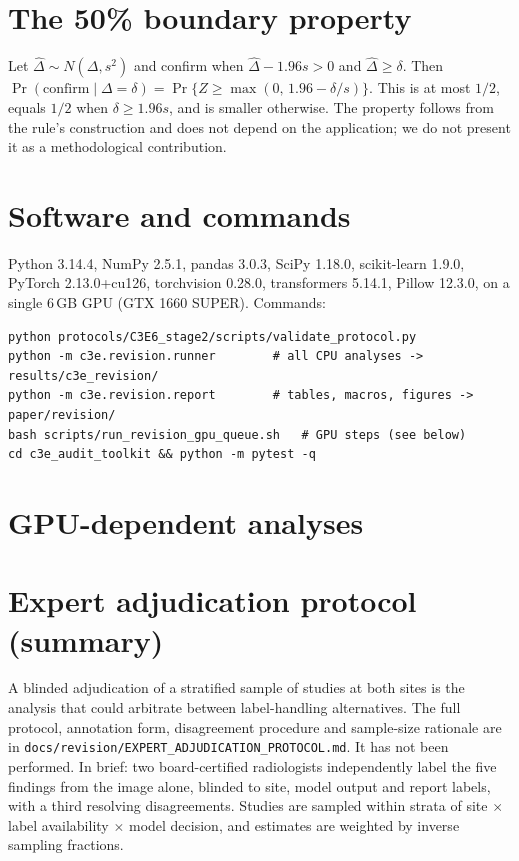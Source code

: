 \documentclass[10pt,a4paper]{article}
\begin{document}
\section{The 50\% boundary property}
Let $\hat\Delta\sim N(\Delta,s^2)$ and confirm when $\hat\Delta-1.96s>0$ and
$\hat\Delta\ge\delta$. Then
$\Pr(\text{confirm}\mid\Delta=\delta)=\Pr\{Z\ge\max(0,\,1.96-\delta/s)\}$. This
is at most $1/2$, equals $1/2$ when $\delta\ge1.96s$, and is smaller otherwise. The
property follows from the rule's construction and does not depend on the
application; we do not present it as a methodological contribution.

\section{Software and commands}
Python 3.14.4, NumPy 2.5.1, pandas 3.0.3, SciPy 1.18.0, scikit-learn 1.9.0,
PyTorch 2.13.0+cu126, torchvision 0.28.0, transformers 5.14.1, Pillow 12.3.0, on
a single 6\,GB GPU (GTX 1660 SUPER). Commands:
\begin{verbatim}
python protocols/C3E6_stage2/scripts/validate_protocol.py
python -m c3e.revision.runner        # all CPU analyses -> results/c3e_revision/
python -m c3e.revision.report        # tables, macros, figures -> paper/revision/
bash scripts/run_revision_gpu_queue.sh   # GPU steps (see below)
cd c3e_audit_toolkit && python -m pytest -q
\end{verbatim}

\section{GPU-dependent analyses}


\section{Expert adjudication protocol (summary)}
A blinded adjudication of a stratified sample of studies at both sites is the
analysis that could arbitrate between label-handling alternatives. The full
protocol, annotation form, disagreement procedure and sample-size rationale are
in \texttt{docs/revision/EXPERT\_ADJUDICATION\_PROTOCOL.md}. It has not been
performed. In brief: two board-certified radiologists independently label the
five findings from the image alone, blinded to site, model output and report
labels, with a third resolving disagreements. Studies are sampled within strata
of site $\times$ label availability $\times$ model decision, and estimates are
weighted by inverse sampling fractions.
\end{document}

